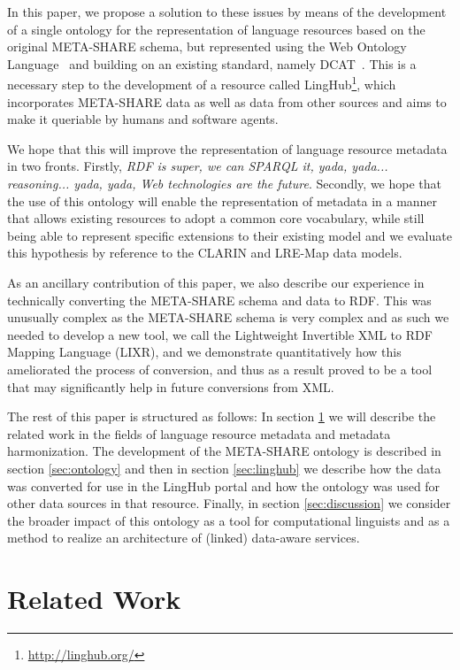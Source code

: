 \documentclass{llncs}
\begin{document}
In this paper, we propose a solution to these issues by means of the development
of a single ontology for the representation of language resources based on the
original META-SHARE schema, but represented using the Web Ontology
Language~\cite{motik2012owl} and building on an existing standard, namely
DCAT~\cite{maali2014data}. This is a necessary step to the development of a
resource called LingHub\footnote{\url{http://linghub.org/}}, which incorporates
META-SHARE data as well as data from other sources and aims to make it queriable
by humans and software agents.

We hope that this will improve the representation
of language resource metadata in two fronts. Firstly, \textit{RDF is super, we
    can SPARQL it, yada, yada... reasoning... yada, yada, Web technologies are
the future}. Secondly, we hope that the use of this ontology will enable the
representation of metadata in a manner that allows existing resources to adopt a
common core vocabulary, while still being able to represent specific extensions
to their existing model and we evaluate this hypothesis by reference to the
CLARIN and LRE-Map data models.

As an ancillary contribution of this paper, we also describe our experience in
technically converting the META-SHARE schema and data to RDF. This was unusually
complex as the META-SHARE schema is very complex and as such we needed to
develop a new tool, we call the Lightweight Invertible XML to RDF Mapping
Language (LIXR), and we demonstrate quantitatively how this ameliorated the
process of conversion, and thus as a result proved to be a tool that may
significantly help in future conversions from XML.

The rest of this paper is structured as follows: In section
\ref{sec:relatedwork} we will describe the related work in the fields of
language resource metadata and metadata harmonization. The development of the
META-SHARE ontology is described in section \ref{sec:ontology} and then in
section \ref{sec:linghub} we describe how the data was converted for use in the
LingHub portal and how the ontology was used for other data sources in that
resource. Finally, in section \ref{sec:discussion} we consider the broader
impact of this ontology as a tool for computational linguists and as a method to
realize an architecture of (linked) data-aware services.

\section{Related Work}
\label{sec:relatedwork}
\end{document}
